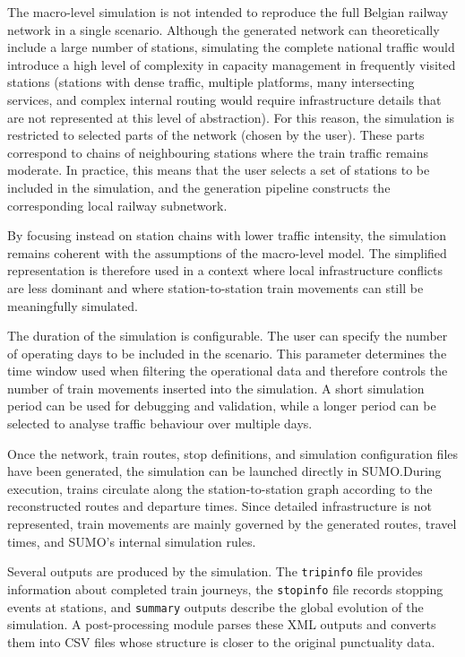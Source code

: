 The macro-level simulation is not intended to reproduce the full Belgian railway network in a single scenario. Although 
the generated network can theoretically include a large number of stations, simulating the complete national traffic 
would introduce a high level of complexity in capacity management in frequently visited stations (stations with dense 
traffic, multiple platforms, many intersecting services, and complex internal routing would require infrastructure details 
that are not represented at this level of abstraction). For this reason, the simulation is restricted to selected parts of 
the network (chosen by the user). These parts correspond to chains of neighbouring stations where the train traffic remains 
moderate. In practice, this means that the user selects a set of stations to be included in the simulation, and the 
generation pipeline constructs the corresponding local railway subnetwork.

By focusing instead on station chains with lower traffic intensity, the simulation remains coherent with the assumptions 
of the macro-level model. The simplified representation is therefore used in a context where local infrastructure conflicts 
are less dominant and where station-to-station train movements can still be meaningfully simulated.

The duration of the simulation is configurable. The user can specify the number of operating days to be included in the 
scenario. This parameter determines the time window used when filtering the operational data and therefore controls the 
number of train movements inserted into the simulation. A short simulation period can be used for debugging and validation, 
while a longer period can be selected to analyse traffic behaviour over multiple days.

Once the network, train routes, stop definitions, and simulation configuration files have been generated, the simulation 
can be launched directly in SUMO.\@ During execution, trains circulate along the station-to-station graph according to 
the reconstructed routes and departure times. Since detailed infrastructure is not represented, train movements are mainly 
governed by the generated routes, travel times, and SUMO’s internal simulation rules.

\newpage

Several outputs are produced by the simulation. The \texttt{tripinfo} file provides information about completed train 
journeys, the \texttt{stopinfo} file records stopping events at stations, and \texttt{summary} outputs describe the 
global evolution of the simulation. A post-processing module parses these XML outputs and converts them into CSV files 
whose structure is closer to the original punctuality data.

